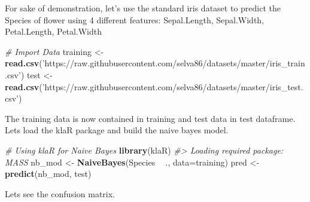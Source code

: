 \documentclass[]{book}
\newenvironment{Shaded}{\begin{snugshade}}{\end{snugshade}}
\newcommand{\CommentTok}[1]{\textcolor[rgb]{0.56,0.35,0.01}{\textit{#1}}}
\newcommand{\DataTypeTok}[1]{\textcolor[rgb]{0.13,0.29,0.53}{#1}}
\newcommand{\KeywordTok}[1]{\textcolor[rgb]{0.13,0.29,0.53}{\textbf{#1}}}
\newcommand{\NormalTok}[1]{#1}
\newcommand{\OperatorTok}[1]{\textcolor[rgb]{0.81,0.36,0.00}{\textbf{#1}}}
\newcommand{\StringTok}[1]{\textcolor[rgb]{0.31,0.60,0.02}{#1}}
\begin{document}
For sake of demonstration, let's use the standard iris dataset to predict the Species of flower using 4 different features: Sepal.Length, Sepal.Width, Petal.Length, Petal.Width

\begin{Shaded}
\begin{Highlighting}[]
\CommentTok{# Import Data}
\NormalTok{training <-}\StringTok{ }\KeywordTok{read.csv}\NormalTok{(}\StringTok{'https://raw.githubusercontent.com/selva86/datasets/master/iris_train.csv'}\NormalTok{)}
\NormalTok{test <-}\StringTok{ }\KeywordTok{read.csv}\NormalTok{(}\StringTok{'https://raw.githubusercontent.com/selva86/datasets/master/iris_test.csv'}\NormalTok{)}
\end{Highlighting}
\end{Shaded}

The training data is now contained in training and test data in test dataframe. Lets load the klaR package and build the naive bayes model.

\begin{Shaded}
\begin{Highlighting}[]
\CommentTok{# Using klaR for Naive Bayes}
\KeywordTok{library}\NormalTok{(klaR)}
\CommentTok{#> Loading required package: MASS}
\NormalTok{nb_mod <-}\StringTok{ }\KeywordTok{NaiveBayes}\NormalTok{(Species }\OperatorTok{~}\StringTok{ }\NormalTok{., }\DataTypeTok{data=}\NormalTok{training)}
\NormalTok{pred <-}\StringTok{ }\KeywordTok{predict}\NormalTok{(nb_mod, test)}
\end{Highlighting}
\end{Shaded}

Lets see the confusion matrix.
\end{document}
